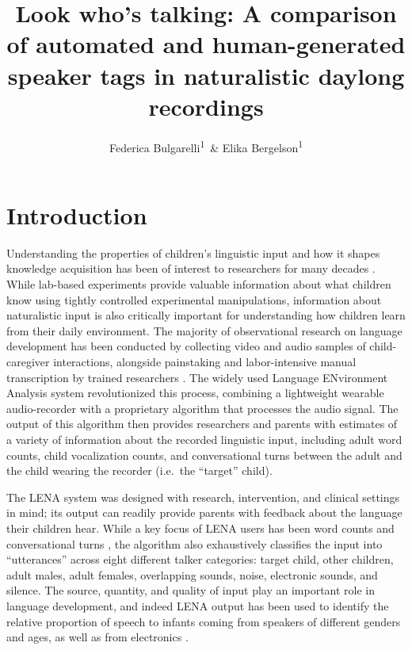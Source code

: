 \documentclass[man,floatsintext]{apa6}
\title{Look who's talking: A comparison of automated and human-generated
speaker tags in naturalistic daylong recordings}
\author{Federica Bulgarelli\textsuperscript{1}~\& Elika
Bergelson\textsuperscript{1}}
\date{}
\affiliation{
\vspace{0.5cm}
\textsuperscript{1} Duke University}
\theoremstyle{definition}
\theoremstyle{definition}
\theoremstyle{definition}
\theoremstyle{remark}
\begin{document}
\maketitle

\hypertarget{introduction}{%
\section{Introduction}\label{introduction}}

Understanding the properties of children's linguistic input and how it
shapes knowledge acquisition has been of interest to researchers for
many decades \citep{Hart1995, Williams1937, Taine1876}. While lab-based
experiments provide valuable information about what children know using
tightly controlled experimental manipulations, information about
naturalistic input is also critically important for understanding how
children learn from their daily environment. The majority of
observational research on language development has been conducted by
collecting video and audio samples of child-caregiver interactions,
alongside painstaking and labor-intensive manual transcription by
trained researchers \citep{Macwhinney2019, Nelson1973}. The widely used
Language ENvironment Analysis system \citep[LENA, LENA Foundation,
Boulder, CO,][]{Greenwood2011} revolutionized this process, combining a
lightweight wearable audio-recorder with a proprietary algorithm that
processes the audio signal. The output of this algorithm then provides
researchers and parents with estimates of a variety of information about
the recorded linguistic input, including adult word counts, child
vocalization counts, and conversational turns between the adult and the
child wearing the recorder (i.e.~the \enquote{target} child).

The LENA system was designed with research, intervention, and clinical
settings in mind; its output can readily provide parents with feedback
about the language their children hear. While a key focus of LENA users
has been word counts and conversational turns \citep{Gilkerson2017}, the
algorithm also exhaustively classifies the input into
\enquote{utterances} across eight different talker categories: target
child, other children, adult males, adult females, overlapping sounds,
noise, electronic sounds, and silence. The source, quantity, and quality
of input play an important role in language development, and indeed LENA
output has been used to identify the relative proportion of speech to
infants coming from speakers of different genders and ages, as well as
from electronics \citep{Christakis2009, Sosa2016, Richards2017}.
\end{document}
